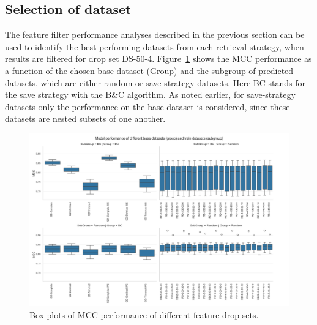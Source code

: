 \subsection{Selection of dataset}
\label{sec:dataset_selection}

The feature filter performance analyses described in the previous section can be used to identify the best-performing datasets
from each retrieval strategy, when results are filtered for drop set DS-50-4. Figure~\ref{fig:dataset_performance_group_subgroup}
shows the MCC performance as a function of the chosen base dataset (Group) and the subgroup of predicted datasets, which are either
random or save-strategy datasets. Here BC stands for the save strategy with the B\&C algorithm.
As noted earlier, for save-strategy datasets only the performance on the base dataset is considered,
since these datasets are nested subsets of one another.
\begin{figure}[ht]
    \centering
    \includegraphics[width =\textwidth]{pictures/feature_filter/group_subgroup_results.png}
    \caption{Box plots of MCC performance of different feature drop sets.}
    \label{fig:dataset_performance_group_subgroup}
\end{figure}

